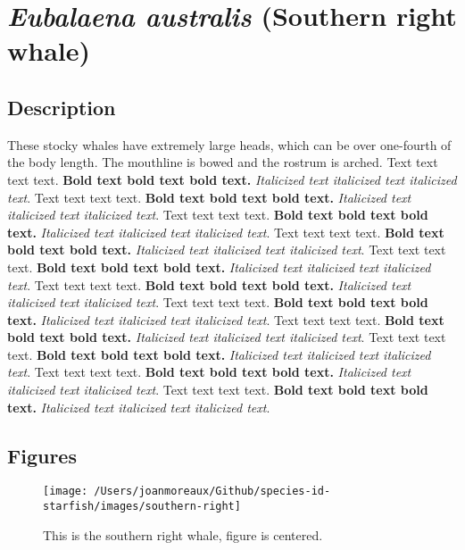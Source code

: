 \documentclass[]{article}
\begin{document}
\hypertarget{eubalaena-australis-southern-right-whale}{%
\section{\texorpdfstring{\emph{Eubalaena australis} (Southern right
whale)}{Eubalaena australis (Southern right whale)}}\label{eubalaena-australis-southern-right-whale}}

\hypertarget{description-1}{%
\subsection{Description}\label{description-1}}

These stocky whales have extremely large heads, which can be over
one-fourth of the body length. The mouthline is bowed and the rostrum is
arched. Text text text text. \textbf{Bold text bold text bold text.}
\emph{Italicized text italicized text italicized text}. Text text text
text. \textbf{Bold text bold text bold text.} \emph{Italicized text
italicized text italicized text}. Text text text text. \textbf{Bold text
bold text bold text.} \emph{Italicized text italicized text italicized
text}. Text text text text. \textbf{Bold text bold text bold text.}
\emph{Italicized text italicized text italicized text}. Text text text
text. \textbf{Bold text bold text bold text.} \emph{Italicized text
italicized text italicized text}. Text text text text. \textbf{Bold text
bold text bold text.} \emph{Italicized text italicized text italicized
text}. Text text text text. \textbf{Bold text bold text bold text.}
\emph{Italicized text italicized text italicized text}. Text text text
text. \textbf{Bold text bold text bold text.} \emph{Italicized text
italicized text italicized text}. Text text text text. \textbf{Bold text
bold text bold text.} \emph{Italicized text italicized text italicized
text}. Text text text text. \textbf{Bold text bold text bold text.}
\emph{Italicized text italicized text italicized text}. Text text text
text. \textbf{Bold text bold text bold text.} \emph{Italicized text
italicized text italicized text}.

\newpage

\hypertarget{figures}{%
\subsection{Figures}\label{figures}}

\begin{figure}

\texttt{[image: /Users/joanmoreaux/Github/species-id-starfish/images/southern-right]} \hfill{}

\caption{This is the southern right whale, figure is centered.}\label{fig:southern-right-whale}
\end{figure}
\end{document}

